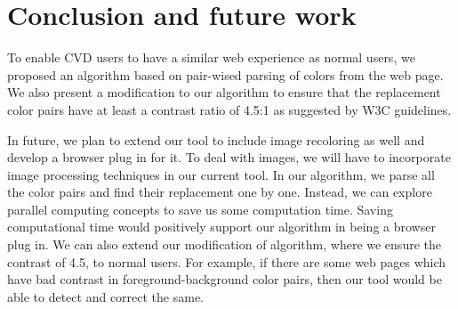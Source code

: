 \chapter{Conclusion and future work}
\thispagestyle{plain}

\label{Conclusion and future work}

To enable CVD users to have a similar web experience as normal users, we proposed an algorithm based on pair-wised parsing of colors from the web page. We also present a modification to our algorithm to ensure that the replacement color pairs have at least a contrast ratio of 4.5:1 as suggested by W3C guidelines.

In future, we plan to extend our tool to include image recoloring as well and develop a browser plug in for it. To deal with images, we will have to incorporate image processing techniques in our current tool. In our algorithm, we parse all the color pairs and find their replacement one by one. Instead, we can explore parallel computing concepts to save us some computation time. Saving computational time would positively support our algorithm in being a browser plug in. We can also extend our modification of algorithm, where we ensure the contrast of 4.5, to normal users. For example, if there are some web pages which have bad contrast in foreground-background color pairs, then our tool would be able to detect and correct the same.   